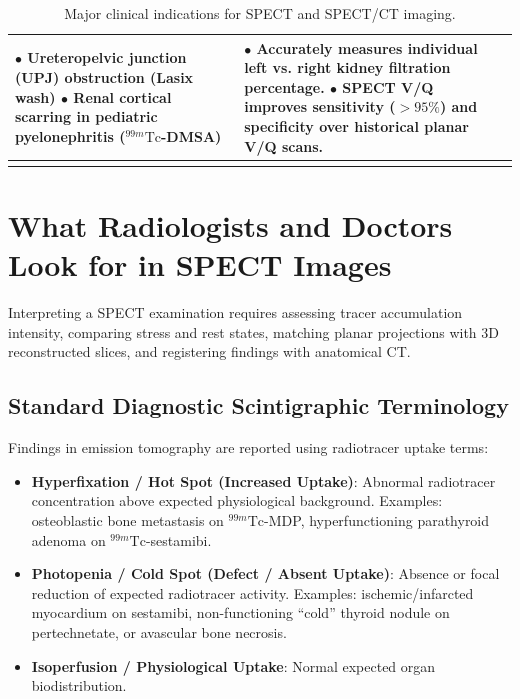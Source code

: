 \documentclass[11pt,a4paper]{article}
\begin{document}
\begin{longtable}{p{3.2cm}p{6cm}p{6cm}}
$\bullet$ Ureteropelvic junction (UPJ) obstruction (Lasix wash)\newline
$\bullet$ Renal cortical scarring in pediatric pyelonephritis ($^{99m}\text{Tc}$-DMSA) & 
$\bullet$ Accurately measures individual left vs. right kidney filtration percentage.\newline
$\bullet$ SPECT V/Q improves sensitivity ($>95\%$) and specificity over historical planar V/Q scans. \\
\bottomrule
\caption{Major clinical indications for SPECT and SPECT/CT imaging.}
\label{tab:clinical_indications}
\end{longtable}

\section{What Radiologists and Doctors Look for in SPECT Images}

Interpreting a SPECT examination requires assessing tracer accumulation intensity, comparing stress and rest states, matching planar projections with 3D reconstructed slices, and registering findings with anatomical CT.

\subsection{Standard Diagnostic Scintigraphic Terminology}
Findings in emission tomography are reported using radiotracer uptake terms:
\begin{itemize}[leftmargin=*]
    \item \textbf{Hyperfixation / Hot Spot (Increased Uptake)}: Abnormal radiotracer concentration above expected physiological background. Examples: osteoblastic bone metastasis on $^{99m}\text{Tc}$-MDP, hyperfunctioning parathyroid adenoma on $^{99m}\text{Tc}$-sestamibi.
    \item \textbf{Photopenia / Cold Spot (Defect / Absent Uptake)}: Absence or focal reduction of expected radiotracer activity. Examples: ischemic/infarcted myocardium on sestamibi, non-functioning ``cold'' thyroid nodule on pertechnetate, or avascular bone necrosis.
    \item \textbf{Isoperfusion / Physiological Uptake}: Normal expected organ biodistribution.
\end{itemize}
\end{document}
